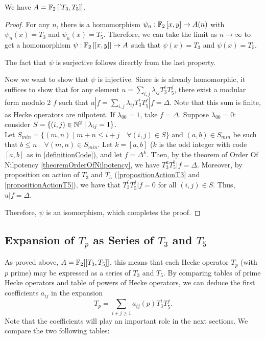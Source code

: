 \begin{property}
	We have $A = \mathbb{F}_2 \left[\left[ T_3, T_5 \right]\right]$.
\end{property}
\begin{proof}
	For any $n$, there is a homomorphism $\psi_n: \mathbb{F}_2 \left[ x, y \right] \to A(n)$ with $\psi_n(x) = T_3$ and $\psi_n(x) = T_5$.
	Therefore, we can take the limit as $n \to \infty$ to get a homomorphism $\psi: \mathbb{F}_2 \left[\left[ x, y \right]\right] \to A$ such that $\psi(x) = T_3$ and $\psi(x) = T_5$.
	
	The fact that $\psi$ is surjective follows directly from the last property.
	
	Now we want to show that $\psi$ is injective.
	Since is is already homomorphic, it suffices to show that for any element $u = \sum_{i,j} \lambda_{ij}T_3^iT_5^j$, there exist a modular form modulo 2 $f$ such that $u|f = \sum_{i,j} \lambda_{ij}T_3^iT_5^j|f = \Delta$.
	Note that this sum is finite, as Hecke operators are nilpotent.
	If $\lambda_{00}=1$, take $f=\Delta$.
	Suppose $\lambda_{00}=0$: consider $S = \{ (i,j) \in \mathbb{N}^2 \mid \lambda_{ij}=1 \}$.\\
	Let $S_{min} = \{ (m,n) \mid m+n \leq i+j \quad \forall (i,j) \in S \}$ and $(a,b) \in S_{min}$ be such that $b \leq n \quad \forall (m,n) \in S_{min}$.
	Let $k = [a,b]$ ($k$ is the odd integer with code $[a,b]$ as in \ref{definitionCode}), and let $f = \Delta^k$.
	Then, by the theorem of Order Of Nilpotency \ref{theoremOrderOfNilpotency}, we have $T_3^aT_5^b|f=\Delta$.
	Moreover, by proposition on action of $T_3$ and $T_5$ (\ref{propositionActionT3} and \ref{propositionActionT5}), we have that $T_3^iT_5^j|f=0$ for all $(i,j) \in S$.
	Thus, $u|f = \Delta$.
	
	Therefore, $\psi$ is an isomorphism, which completes the proof.
\end{proof}



\subsection{Expansion of $T_p$ as Series of $T_3$ and $T_5$}
As proved above, $A = \mathbb{F}_2[[T_3, T_5]]$, this means that each Hecke operator $T_p$ (with $p$ prime) may be expressed as a series of $T_3$ and $T_5$.
By comparing tables of prime Hecke operators and table of powers of Hecke operators, we can deduce the first coefficients $a_{ij}$ in the expansion 
$$
T_p = \sum_{i+j \geq 1} a_{ij}(p) T_3^iT_5^j.
$$
Note that the coefficients will play an important role in the next sections.
We compare the two following tables:
